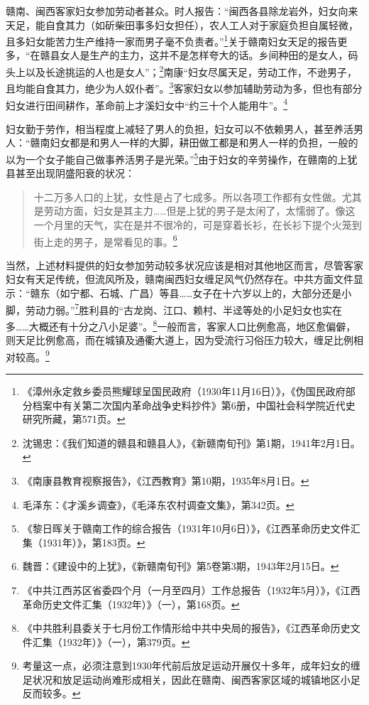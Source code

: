 赣南、闽西客家妇女参加劳动者甚众。时人报告：“闽西各县除龙岩外，妇女向来天足，能自食其力（如斫柴田事多妇女担任），农人工人对于家庭负担自属轻微，且多妇女能苦力生产维持一家而男子毫不负责者。”\footnote{《漳州永定救乡委员熊耀球呈国民政府（1930年11月16日）》，《伪国民政府部分档案中有关第二次国内革命战争史料抄件》第6册，中国社会科学院近代史研究所藏，第571页。}关于赣南妇女天足的报告更多，“在赣县女人是生产的主力，这并不是怎样夸大的话。乡间种田的是女人，码头上以及长途挑运的人也是女人”；\footnote{沈锡忠：《我们知道的赣县和赣县人》，《新赣南旬刊》第1期，1941年2月1日。}南康“妇女尽属天足，劳动工作，不逊男子，且均能自食其力，绝少为人奴仆者”。\footnote{《南康县教育视察报告》，《江西教育》第10期，1935年8月1日。}客家妇女以参加辅助劳动为多，但也有部分妇女进行田间耕作，革命前上才溪妇女中“约三十个人能用牛”。\footnote{毛泽东：《才溪乡调查》，《毛泽东农村调查文集》，第342页。}


妇女勤于劳作，相当程度上减轻了男人的负担，妇女可以不依赖男人，甚至养活男人：“赣南妇女都是和男人一样的大脚，耕田做工都是和男人一样的负担，一般的以为一个女子能自己做事养活男子是光荣。”\footnote{《黎日晖关于赣南工作的综合报告（1931年10月6日）》，《江西革命历史文件汇集（1931年）》，第183页。}由于妇女的辛劳操作，在赣南的上犹县甚至出现阴盛阳衰的状况：

\begin{quote}

十二万多人口的上犹，女性是占了七成多。所以各项工作都有女性做。尤其是劳动方面，妇女是其主力……但是上犹的男子是太闲了，太懦弱了。像这一个月里的天气，实在是并不很冷的，可是穿着长衫，在长衫下提个火笼到街上走的男子，是常看见的事。\footnote{魏晋：《建设中的上犹》，《新赣南旬刊》第5卷第3期，1943年2月15日。}
\end{quote}


当然，上述材料提供的妇女参加劳动较多状况应该是相对其他地区而言，尽管客家妇女有天足传统，但流风所及，赣南闽西妇女缠足风气仍然存在。中共方面文件显示：“赣东（如宁都、石城、广昌）等县……女子在十六岁以上的，大部分还是小脚，劳动力弱。”\footnote{《中共江西苏区省委四个月（一月至四月）工作总报告（1932年5月）》，《江西革命历史文件汇集（1932年）》（一），第168页。}胜利县的“古龙岗、江口、赖村、半迳等处的小足妇女也实在多……大概还有十分之八小足婆”。\footnote{《中共胜利县委关于七月份工作情形给中共中央局的报告》，《江西革命历史文件汇集（1932年）》（一），第379页。}一般而言，客家人口比例愈高，地区愈偏僻，则天足比例愈高，而在城镇及通衢大道上，因为受流行习俗压力较大，缠足比例相对较高。\footnote{考量这一点，必须注意到1930年代前后放足运动开展仅十多年，成年妇女的缠足状况和放足运动尚难形成相关，因此在赣南、闽西客家区域的城镇地区小足反而较多。}


